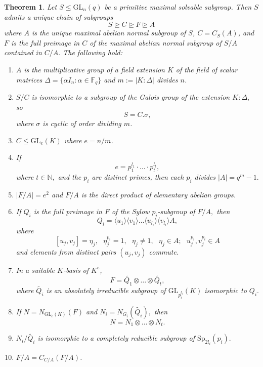\documentclass[a4paper,reqno,11pt]{amsart}
\newtheorem{Th}{Theorem}[section]
\theoremstyle{definition}
\theoremstyle{remark}
\numberwithin{equation}{section}
\newcommand{\GL}{{\mathrm{GL}}}
\newcommand{\Sp}{{\mathrm{Sp}}}
\begin{document}
\begin{Th}\label{suplem}
Let $S \le \GL_n(q)$ be a primitive maximal solvable subgroup. Then $S$
admits a unique chain of subgroups 
\begin{equation}\label{ryad}
S \trianglerighteq C \trianglerighteq F \trianglerighteq A
\end{equation}
 where $A$ is the unique maximal abelian normal subgroup of $S$,  $C =C_S(A)$, and  $F$ is the full preimage in $C$ of the maximal  abelian normal subgroup of $S/A$ contained in $C/A.$ The following hold: 
\begin{enumerate}[font=\normalfont]
\item[$(a)$] $A$ is the multiplicative group of a field extension $K$ of the field of scalar matrices $ \Delta = \{\alpha I_n: \alpha \in \mathbb{F}_q\}$ and $m:=|K : \Delta|$ divides  $n$.
\item[$(b)$]  $S/C$ is isomorphic to a subgroup of the Galois group of the extension $K:\Delta,$ so 
$$S=C.\sigma,$$
where $\sigma$ is cyclic of order dividing $m$. 
\item[$(c)$] $C \le \GL_e(K)$ where $e=n/m$.
\item[$(d)$] If
\begin{equation}\label{r}
 e=p_1^{l_1} \cdot \ldots \cdot p_t^{l_t},
\end{equation}
where $t \in \mathbb{N},$ and the $p_i$ are distinct primes, then each $p_i$ divides $|A|=q^m-1.$
\item[$(e)$] $|F/A|=e^2$ and $F/A$ is the direct product of elementary abelian groups. 
\item[$(f)$] If $Q_i$ is the full preimage in $F$ of the Sylow $p_i$-subgroup of $F/A,$ then
$$Q_i= \langle u_1 \rangle \langle v_1 \rangle \ldots \langle u_{l_i} \rangle \langle v_{l_i} \rangle A,$$
where 
\begin{equation}\label{quv}
[u_j,v_j]=\eta_j, \text{ } \eta_j^{p_i}=1, \text{ } \eta_j \ne 1, \text{ } \eta_j \in A; \text{ } u_j^{p_i},v_j^{p_i} \in A
\end{equation}
and elements from distinct pairs $(u_j,v_j)$ commute.
\item[$(g)$] In a suitable $K$-basis of $K^e$, 
$$F=\tilde{Q_1} \otimes \ldots \otimes \tilde{Q_t},$$
where $\tilde{Q_i}$ is an absolutely irreducible subgroup of $\GL_{p_i^{l_i}}(K)$ isomorphic to $Q_i.$
\item[$(h)$] If $N=N_{\GL_e(K)}(F)$ and $N_i=N_{G_i}(\tilde{Q_i}),$ then
 $$N=N_1 \otimes \ldots \otimes N_t.$$
\item[$(i)$] $N_i/\tilde{Q_i}$ is isomorphic to a completely reducible subgroup of $\Sp_{2l_i}(p_i).$
\item[$(j)$] $F/A=C_{C/A}(F/A)$.

\end{enumerate}
\end{Th}
\end{document}
